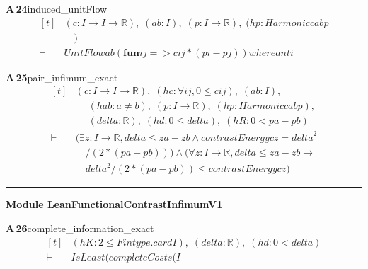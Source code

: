 \documentclass[conference]{IEEEtran}
\theoremstyle{definition}
\newcommand{\lean}[1]{\textsf{\footnotesize #1}}
\begin{document}
\noindent\textbf{A\,24}\quad\lean{induced\_unitFlow}
{\footnotesize\[ \begin{aligned}[t]
&(\mathit{c} : \mathit{I} \to \mathit{I} \to \mathbb{R} ),\; (\mathit{a} \mathit{b} : \mathit{I}),\; (\mathit{p} : \mathit{I} \to \mathbb{R} ),\; (\mathit{hp} : \mathit{Harmonic} \mathit{c} \mathit{a} \mathit{b} \mathit{p}\\
&\quad )\\
\vdash\;&\mathit{UnitFlow} \mathit{a} \mathit{b} (\mathbf{fun} \mathit{i} \mathit{j} => \mathit{c} \mathit{i} \mathit{j}*(\mathit{p} \mathit{i}-\mathit{p} \mathit{j})) \mathit{where} \mathit{anti}
\end{aligned} \]}

\noindent\textbf{A\,25}\quad\lean{pair\_infimum\_exact}
{\footnotesize\[ \begin{aligned}[t]
&(\mathit{c} : \mathit{I} \to \mathit{I} \to \mathbb{R} ),\; (\mathit{hc} : \forall \mathit{i} \mathit{j}, 0 \leq \mathit{c} \mathit{i} \mathit{j}),\; (\mathit{a} \mathit{b} : \mathit{I}),\\
&\quad \; (\mathit{hab} : \mathit{a} \neq \mathit{b}),\; (\mathit{p} : \mathit{I} \to \mathbb{R} ),\; (\mathit{hp} : \mathit{Harmonic} \mathit{c} \mathit{a} \mathit{b} \mathit{p}),\\
&\quad \; (\mathit{delta} : \mathbb{R} ),\; (\mathit{hd} : 0 \leq \mathit{delta}),\; (\mathit{hR} : 0 < \mathit{p} \mathit{a}-\mathit{p} \mathit{b})\\
\vdash\;&(\exists \mathit{z} : \mathit{I} \to \mathbb{R} , \mathit{delta} \leq \mathit{z} \mathit{a}-\mathit{z} \mathit{b} \wedge \mathit{contrastEnergy} \mathit{c} \mathit{z} = \mathit{delta}^{2}\\
&\quad /(2*(\mathit{p} \mathit{a}-\mathit{p} \mathit{b}))) \wedge (\forall \mathit{z} : \mathit{I} \to \mathbb{R} , \mathit{delta} \leq \mathit{z} \mathit{a}-\mathit{z} \mathit{b} \to\\
&\quad \mathit{delta}^{2}/(2*(\mathit{p} \mathit{a}-\mathit{p} \mathit{b})) \leq \mathit{contrastEnergy} \mathit{c} \mathit{z})
\end{aligned} \]}

\vspace{4pt}\noindent\rule{\columnwidth}{0.4pt}\par\vspace{2pt}
\noindent\textbf{Module \lean{LeanFunctionalContrastInfimumV1}}\par\vspace{3pt}

\noindent\textbf{A\,26}\quad\lean{complete\_information\_exact}
{\footnotesize\[ \begin{aligned}[t]
&(\mathit{hK} : 2 \leq \mathit{Fintype}.\mathit{card} \mathit{I}),\; (\mathit{delta} : \mathbb{R} ),\; (\mathit{hd} : 0<\mathit{delta})\\
\vdash\;&\mathit{IsLeast} (\mathit{completeCosts} (\mathit{I}
\end{aligned} \]}
\end{document}
